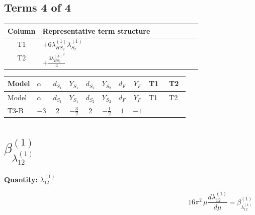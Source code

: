 \documentclass[8pt]{article}
\begin{document}
\begin{landscape}
\subsection*{Terms 4 of 4}
\begin{center}
\begin{tabular}{@{}c >{\raggedright\arraybackslash}p{0.82\linewidth}@{}}
\toprule
Column & Representative term structure \\
\midrule
T1 & \(\displaystyle +6 {\lambda_{HS_2}^{(1)}} {\lambda_{S_2}^{(1)}}\) \\
\midrule
T2 & \(\displaystyle +\frac{3 {\lambda_{HS_2}^{(A)}}^2}{4}\) \\
\midrule
\bottomrule
\end{tabular}
\end{center}
\smallskip
\tiny
\begin{longtable}{@{}llcccccc >{\raggedright\arraybackslash}p{0.21\linewidth} >{\raggedright\arraybackslash}p{0.21\linewidth}@{}}
\toprule
Model & $\alpha$ & $d_{S_1}$ & $Y_{S_1}$ & $d_{S_2}$ & $Y_{S_2}$ & $d_F$ & $Y_F$ & T1 & T2 \\
\midrule
\endfirsthead
\toprule
Model & $\alpha$ & $d_{S_1}$ & $Y_{S_1}$ & $d_{S_2}$ & $Y_{S_2}$ & $d_F$ & $Y_F$ & T1 & T2 \\
\midrule
\endhead
T3-B & $-3$ & $2$ & $-\frac{3}{2}$ & $2$ & $-\frac{1}{2}$ & $1$ & $-1$ & \scriptsize\adjustbox{max width=\linewidth}{$\begin{gathered} +6 {\lambda_{HS_2}^{(1)}} {\lambda_{S_2}^{(1)}}\end{gathered}$} & \scriptsize\adjustbox{max width=\linewidth}{$\begin{gathered} +\frac{3 {\lambda_{HS_2}^{(A)}}^2}{4}\end{gathered}$} \\
\midrule
\bottomrule
\end{longtable}
\clearpage
\section*{$\beta_{\lambda_{12}^{(1)}}^{(1)}$}
\noindent\textbf{Quantity: }$\lambda_{12}^{(1)}$\par\smallskip
\[16\pi^2\,\mu\frac{d \lambda_{12}^{(1)}}{d\mu}=\beta_{\lambda_{12}^{(1)}}^{(1)}\]

\end{landscape}
\end{document}
